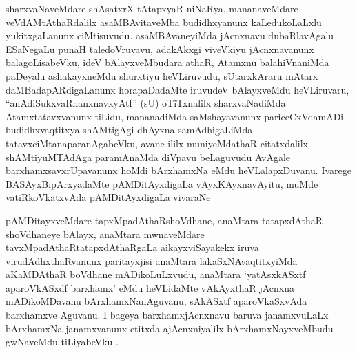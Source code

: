 \begin{artha}
sharxvaNaveMdare shAsatxrX tAtapxyaR niNaRya, mananaveMdare veVdAMtAthaRdalilx asaMBAvitaveMba budidhxyanunx kaLedukoLaLxlu yukitxgaLanunx ciMtisuvudu. asaMBAvaneyiMda jAcnxnavu dubaRlavAgalu ESaNegaLu punaH taledoVruvavu, adakAkxgi viveVkiyu jAcnxnavanunx balagoLisabeVku, ideV bAlayxveMbudara athaR, Atamxnu balahiVnaniMda paDeyalu ashakayxneMdu shurxtiyu heVLiruvudu, sUtarxkAraru mAtarx daMBadapARdigaLanunx horapaDadaMte iruvudeV bAlayxveMdu heVLiruvaru, ``anAdiSukxvaRnanxnavxyAtf'' (sU) oTiTxnalilx sharxvaNadiMda Atamxtatavxvanunx tiLidu, mananadiMda saMshayavanunx pariceCxVdamADi budidhxvaqtitxya shAMtigAgi dhAyxna samAdhigaLiMda tatavxciMtanaparanAgabeVku, avane ililx muniyeMdathaR citatxdalilx shAMtiyuMTAdAga paramAnaMda diVpavu beLaguvudu AvAgale barxhamxsavxrUpavanunx hoMdi bArxhamxNa eMdu heVLalapxDuvanu. Ivarege BASAyxBipArxyadaMte pAMDitAyxdigaLa vAyxKAyxnavAyitu, muMde vatiRkoVkatxvAda pAMDitAyxdigaLa vivaraNe \mdash  
\end{artha}


\begin{artha}
pAMDitayxveMdare tapxMpadAthaRshoVdhane, anaMtara tatapxdAthaR shoVdhaneye bAlayx, anaMtara mwnaveMdare tavxMpadAthaRtatapxdAthaRgaLa aikayxviSayakekx iruva virudAdhxthaRvanunx paritayxjisi anaMtara lakaSxNAvaqtitxyiMda aKaMDAthaR boVdhane mADikoLuLxvudu, anaMtara `yatAsxkASxtf aparoVkASxdf barxhamx' eMdu heVLidaMte vAkAyxthaR jAcnxna mADikoMDavanu bArxhamxNanAguvanu, sAkASxtf aparoVkaSxvAda barxhamxve Aguvanu. I bageya barxhamxjAcnxnavu baruva janamxvuLaLx bArxhamxNa janamxvanunx etitxda ajAcnxniyalilx bArxhamxNayxveMbudu gwNaveMdu tiLiyabeVku .
\end{artha}


